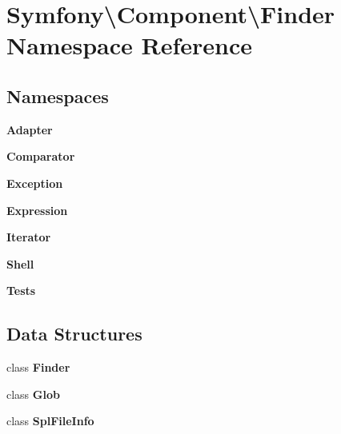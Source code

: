 \section{Symfony\textbackslash{}Component\textbackslash{}Finder Namespace Reference}
\label{namespace_symfony_1_1_component_1_1_finder}
\subsection*{Namespaces}
\begin{DoxyCompactItemize}
\item 
 {\bf Adapter}
\item 
 {\bf Comparator}
\item 
 {\bf Exception}
\item 
 {\bf Expression}
\item 
 {\bf Iterator}
\item 
 {\bf Shell}
\item 
 {\bf Tests}
\end{DoxyCompactItemize}
\subsection*{Data Structures}
\begin{DoxyCompactItemize}
\item 
class {\bf Finder}
\item 
class {\bf Glob}
\item 
class {\bf Spl\+File\+Info}
\end{DoxyCompactItemize}
